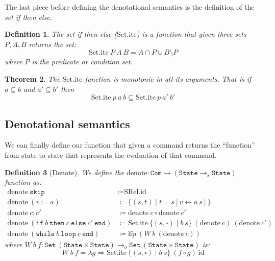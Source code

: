 \documentclass[
  a4paper, 
  10pt, 
  parskip=half, 
  DIV=20,
  toc=bibliography,
  usegeometry,
]{scrartcl}
\newtheorem{theorem}{Theorem}[section]
\newtheorem{definition}[theorem]{Definition}
\newcommand{\funfont}[1]{\text{#1}}
\newcommand{\tyfont}[1]{\texttt{#1}}
\renewcommand{\mapsto}{\Rightarrow}
\begin{document}
The last piece before defining the denotational semantics is the definition of
the \emph{set if then else}.

\begin{definition}
  The \emph{set if then else} (\(\funfont{Set.ite}\)) is a function that given three sets \(P, A, B\)
  returns the set:
  \[
    \funfont{Set.ite} \ P \ A \ B = A \cap P \cup B \setminus P
  \]
  where \(P\) is the \emph{predicate} or \emph{condition} set.
\end{definition}

\begin{theorem}
  The \(\funfont{Set.ite}\) function is monotonic in all its arguments.
  That is if \(a \subseteq b\) and \(a' \subseteq b'\) then
  \[
  \funfont{Set.ite} \ p \ a \ b \subseteq \funfont{Set.ite} \ p \ a' \ b'
  \]
\end{theorem}

\subsection{Denotational semantics}

We can finally define our function that given a command returns the 
\enquote{function} from state to state that represents the evaluation of that
command.

\begin{definition}[Denote]
We define the \(\funfont{denote}: \tyfont{Com} \to (\tyfont{State} \to_s \tyfont{State})\) 
function as:
  \begin{align*}
    \funfont{denote} \ \texttt{skip} &\coloneqq \funfont{SRel.id} \\
    \funfont{denote} \ (v \ \texttt{:=} \ a) &\coloneqq \{(s, t) \mid t = s[v \leftarrow a \ s]\} \\
    \funfont{denote} \ c;c' &\coloneqq \funfont{denote} \ c \circ \funfont{denote} \ c' \\
    \funfont{denote} \ (\texttt{if} \ b \ \texttt{then} \ c \ \texttt{else} \ c' \ \texttt{end}) &\coloneqq \funfont{Set.ite} \ \{(s, \square) \mid b \ s\} \ (\funfont{denote} \ c) \ (\funfont{denote} \ c') \\
    \funfont{denote} \ (\texttt{while} \ b \ \texttt{loop} \ c \ \texttt{end}) &\coloneqq \funfont{lfp} \ (W \ b \ (\funfont{denote} \ c))
  \end{align*}
  where \(W \ b \ f:\tyfont{Set} \ (\tyfont{State} \times \tyfont{State}) \to_o 
    \tyfont{Set} \ (\tyfont{State} \times \tyfont{State})\) is:
  \[
    W \ b \ f = \lambda g \mapsto \funfont{Set.ite} \ \{(s, \square) \mid b \ s\} \ (f \circ g) \ \funfont{id}
  \]
\end{definition}
\end{document}
